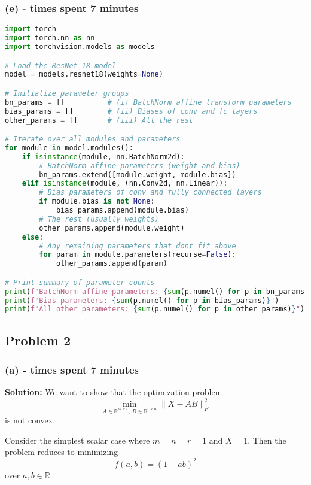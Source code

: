 \documentclass[11pt, reqno, letterpaper, twoside]{amsart}
\theoremstyle{plain}
\theoremstyle{definition}
\begin{document}
\subsubsection*{(e) - times spent 7 minutes}
\begin{lstlisting}[language=Python, label={lst:resnet18_params}]
import torch
import torch.nn as nn
import torchvision.models as models

# Load the ResNet-18 model
model = models.resnet18(weights=None)

# Initialize parameter groups
bn_params = []          # (i) BatchNorm affine transform parameters
bias_params = []        # (ii) Biases of conv and fc layers
other_params = []       # (iii) All the rest

# Iterate over all modules and parameters
for module in model.modules():
    if isinstance(module, nn.BatchNorm2d):
        # BatchNorm affine parameters (weight and bias)
        bn_params.extend([module.weight, module.bias])
    elif isinstance(module, (nn.Conv2d, nn.Linear)):
        # Bias parameters of conv and fully connected layers
        if module.bias is not None:
            bias_params.append(module.bias)
        # The rest (usually weights)
        other_params.append(module.weight)
    else:
        # Any remaining parameters that dont fit above
        for param in module.parameters(recurse=False):
            other_params.append(param)

# Print summary of parameter counts
print(f"BatchNorm affine parameters: {sum(p.numel() for p in bn_params)}")
print(f"Bias parameters: {sum(p.numel() for p in bias_params)}")
print(f"All other parameters: {sum(p.numel() for p in other_params)}")
\end{lstlisting}


\subsection*{Problem 2}
\subsubsection*{(a) - times spent 7 minutes}
\textbf{Solution:}  
We want to show that the optimization problem
\[
\min_{A \in \mathbb{R}^{m \times r},\, B \in \mathbb{R}^{r \times n}} \|X - AB\|_F^2
\]
is not convex.

\smallskip

Consider the simplest scalar case where \( m = n = r = 1 \) and \( X = 1 \).  
Then the problem reduces to minimizing
\[
f(a,b) = (1 - ab)^2
\]
over \( a, b \in \mathbb{R} \).
\end{document}
